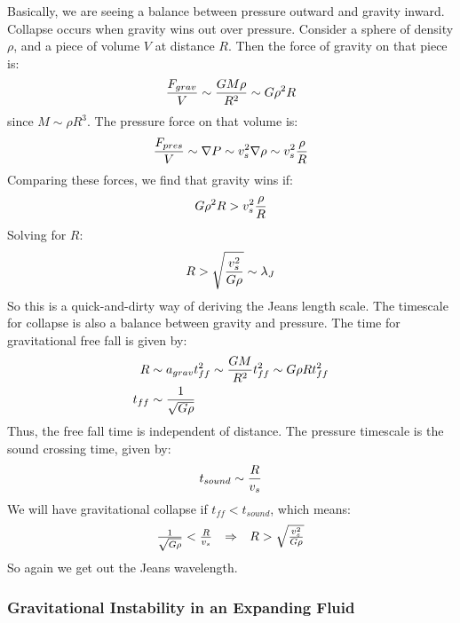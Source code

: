 \documentclass{article}
\def\imply{\Rightarrow}
\def\inv#1{\frac{1}{ #1}}
\def\imply{\Rightarrow}
\begin{document}
Basically, we are seeing a balance between pressure outward and gravity inward.
Collapse occurs when gravity wins out over pressure.  Consider a
sphere of density $\rho$, and a piece of volume $V$ at distance $R$.  Then
the force of gravity on that piece is:
$${F_{grav}\over V}\sim{GM\rho\over R^2}\sim G\rho^2R$$
since $M\sim\rho R^3$.  The pressure force on that volume is:
$${F_{pres}\over V}\sim\nabla P\sim v_s^2\nabla \rho\sim v_s^2{\rho\over R}$$
Comparing these forces, we find that gravity wins if:
$$G\rho^2R>v_s^2{\rho\over R}$$
Solving for $R$:
$$R>\sqrt{v_s^2\over G\rho}\sim\lambda_J$$
So this is a quick-and-dirty way of deriving the Jeans length scale.
The timescale for collapse is also a balance between gravity and
pressure.  The time for gravitational free fall is given by:
\begin{align}
R&\sim a_{grav}t_{ff}^2\sim{GM\over R^2}t_{ff}^2
\sim G\rho Rt_{ff}^2\\
t_{ff}&\sim\inv{\sqrt{G\rho}}\\
\end{align}
Thus, the free fall time is independent of distance.
The pressure timescale is the sound crossing time, given by:
$$t_{sound}\sim{R\over v_s}$$
We will have gravitational collapse if $t_{ff}<t_{sound}$, which means:
$$\begin{matrix} \inv{\sqrt{G\rho}}<{R\over v_s}&\imply&R>\sqrt{v_s^2\over G\rho}
\end{matrix}$$
So again we get out the Jeans wavelength.

\subsubsection*{ Gravitational Instability in an Expanding Fluid}
\end{document}
